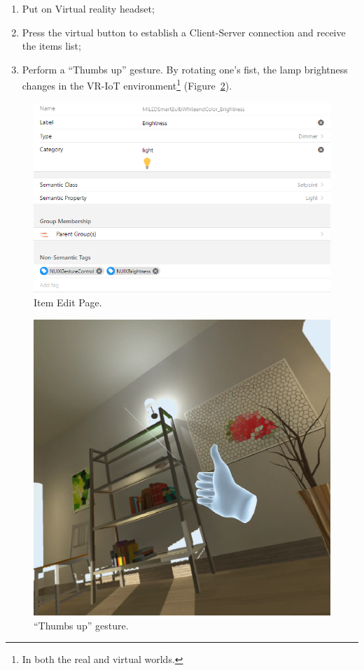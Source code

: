 \begin{enumerate}
    \item Put on Virtual reality headset;
    \item Press the virtual button to establish a Client-Server connection and receive the items list;
    \item Perform a ``Thumbs up'' gesture. By rotating one's fist, the lamp brightness changes in the VR-IoT environment\footnote{In both the real and virtual worlds.} (Figure~\ref{fig:FullBrightnessOculus-figure}).
\end{enumerate}

\begin{figure}
  \centering
  \includegraphics[width = 0.9 \linewidth]{figures/ItemEditPage.png}
  \caption{Item Edit Page.}
  \label{fig:ItemEditPage-figure}
\end{figure}


\begin{figure}
  \centering
  \includegraphics[width = 0.6 \linewidth]{figures/FullBrightnessOculus.png}
  \caption{``Thumbs up'' gesture.}
  \label{fig:FullBrightnessOculus-figure}
\end{figure}

